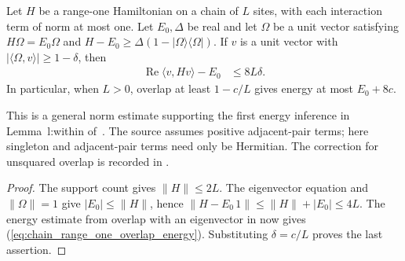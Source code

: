 \begin{lemma}
    \label{thm:chain_range_one_overlap_energy}
    \leanok
    Let $H$ be a range-one Hamiltonian on a chain of $L$ sites, with each
    interaction term of norm at most one. Let $E_0,\Delta$ be real and let
    $\Omega$ be a unit vector satisfying $H\Omega=E_0\Omega$ and
    $H-E_0\ge\Delta(1-|\Omega\rangle\langle\Omega|)$.
    If $v$ is a unit vector with $|\langle\Omega,v\rangle|\ge1-\delta$, then
    \begin{align}
        \operatorname{Re}\langle v,Hv\rangle-E_0
         & \le8L\delta.
        \label{eq:chain_range_one_overlap_energy}
    \end{align}
    In particular, when $L>0$, overlap at least $1-c/L$ gives energy at
    most $E_0+8c$.

    This is a general norm estimate supporting the first energy inference
    in Lemma~l:within of~\cite[lines 509--515]{Landau2015Polynomial}.
    The source assumes positive adjacent-pair terms; here singleton and
    adjacent-pair terms need only be Hermitian. The correction for
    unsquared overlap is recorded in \cite{gap:lvv13_witness_energy}.
\end{lemma}
\begin{proof}\leanok
    The support count gives $\|H\|\le2L$. The eigenvector equation and
    $\|\Omega\|=1$ give $|E_0|\le\|H\|$, hence
    $\|H-E_0\,1\|\le\|H\|+|E_0|\le4L$.
    The energy estimate from overlap with an eigenvector in
    \cite[``Energy bound from overlap with an eigenvector'']{QICLean2026Blueprint}
    now gives (\ref{eq:chain_range_one_overlap_energy}). Substituting
    $\delta=c/L$ proves the last assertion.
\end{proof}

